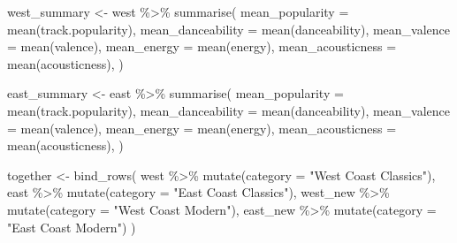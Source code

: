 \documentclass[
]{article}
\newenvironment{Shaded}{\begin{snugshade}}{\end{snugshade}}
\newcommand{\AttributeTok}[1]{\textcolor[rgb]{0.77,0.63,0.00}{#1}}
\newcommand{\FunctionTok}[1]{\textcolor[rgb]{0.00,0.00,0.00}{#1}}
\newcommand{\NormalTok}[1]{#1}
\newcommand{\OtherTok}[1]{\textcolor[rgb]{0.56,0.35,0.01}{#1}}
\newcommand{\SpecialCharTok}[1]{\textcolor[rgb]{0.00,0.00,0.00}{#1}}
\newcommand{\StringTok}[1]{\textcolor[rgb]{0.31,0.60,0.02}{#1}}
\begin{document}
\begin{Shaded}
\begin{Highlighting}[]
\NormalTok{west\_summary }\OtherTok{\textless{}{-}}\NormalTok{ west }\SpecialCharTok{\%\textgreater{}\%}
  \FunctionTok{summarise}\NormalTok{(}
    \AttributeTok{mean\_popularity =} \FunctionTok{mean}\NormalTok{(track.popularity),}
    \AttributeTok{mean\_danceability =} \FunctionTok{mean}\NormalTok{(danceability),}
    \AttributeTok{mean\_valence =} \FunctionTok{mean}\NormalTok{(valence),}
    \AttributeTok{mean\_energy =} \FunctionTok{mean}\NormalTok{(energy),}
    \AttributeTok{mean\_acousticness =} \FunctionTok{mean}\NormalTok{(acousticness),}
\NormalTok{  )}
\end{Highlighting}
\end{Shaded}

\begin{Shaded}
\begin{Highlighting}[]
\NormalTok{east\_summary }\OtherTok{\textless{}{-}}\NormalTok{ east }\SpecialCharTok{\%\textgreater{}\%}
  \FunctionTok{summarise}\NormalTok{(}
    \AttributeTok{mean\_popularity =} \FunctionTok{mean}\NormalTok{(track.popularity),}
    \AttributeTok{mean\_danceability =} \FunctionTok{mean}\NormalTok{(danceability),}
    \AttributeTok{mean\_valence =} \FunctionTok{mean}\NormalTok{(valence),}
    \AttributeTok{mean\_energy =} \FunctionTok{mean}\NormalTok{(energy),}
    \AttributeTok{mean\_acousticness =} \FunctionTok{mean}\NormalTok{(acousticness),}
\NormalTok{  )}
\end{Highlighting}
\end{Shaded}

\begin{Shaded}
\begin{Highlighting}[]
\NormalTok{together }\OtherTok{\textless{}{-}}
  \FunctionTok{bind\_rows}\NormalTok{(}
\NormalTok{    west }\SpecialCharTok{\%\textgreater{}\%} \FunctionTok{mutate}\NormalTok{(}\AttributeTok{category =} \StringTok{"West Coast Classics"}\NormalTok{),}
\NormalTok{    east }\SpecialCharTok{\%\textgreater{}\%} \FunctionTok{mutate}\NormalTok{(}\AttributeTok{category =} \StringTok{"East Coast Classics"}\NormalTok{),}
\NormalTok{    west\_new }\SpecialCharTok{\%\textgreater{}\%} \FunctionTok{mutate}\NormalTok{(}\AttributeTok{category =} \StringTok{"West Coast Modern"}\NormalTok{),}
\NormalTok{    east\_new }\SpecialCharTok{\%\textgreater{}\%} \FunctionTok{mutate}\NormalTok{(}\AttributeTok{category =} \StringTok{"East Coast Modern"}\NormalTok{)}
\NormalTok{  )}
\end{Highlighting}
\end{Shaded}
\end{document}
